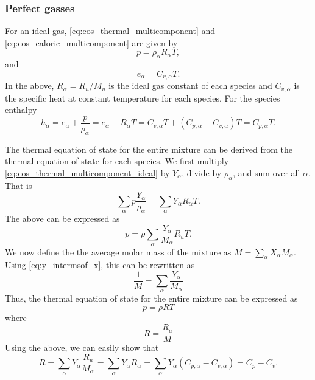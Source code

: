 \documentclass[oneside,a4paper,11pt]{report}
\begin{document}
\subsubsection{Perfect gasses}
For an ideal gas, \cref{eq:eos_thermal_multicomponent} and \cref{eq:eos_caloric_multicomponent} are given by
\begin{equation}
\label{eq:eos_thermal_multicomponent_ideal}
p = \rho_\alpha R_\alpha T,
\end{equation}
and
\begin{equation} 
\label{eq:eos_caloric_multicomponent_ideal}
e_\alpha = C_{v,\alpha} T .
\end{equation}
In the above, $R_\alpha = R_u / M_u$ is the ideal gas constant of each species and $C_{v,\alpha}$ is the specific heat at constant temperature for each species. For the species enthalpy 
\begin{equation}
    h_\alpha = e_\alpha + \frac{p}{\rho_\alpha} = e_\alpha + R_\alpha T = C_{v,\alpha} T + \left ( C_{p,\alpha} - C_{v,\alpha} \right ) T = C_{p,\alpha} T.
\end{equation}

The thermal equation of state for the entire mixture can be derived from the thermal equation of state for each species. We first multiply \cref{eq:eos_thermal_multicomponent_ideal} by $Y_\alpha$, divide by $\rho_\alpha$, and sum over all $\alpha$. That is
\begin{equation}
\sum_\alpha p \frac{Y_\alpha}{\rho_\alpha}= \sum_\alpha Y_\alpha R_\alpha T.
\end{equation}
The above can be expressed as
\begin{equation}
p = \rho \sum_\alpha \frac{Y_\alpha}{M_\alpha} R_u T.
\end{equation}
We now define the the average molar mass of the mixture as $M = \sum_\alpha X_\alpha M_\alpha$. Using \cref{eq:y_intermsof_x}, this can be rewritten as 
\begin{equation}
    \frac{1}{M} = \sum_\alpha \frac{Y_\alpha}{M_\alpha}
\end{equation}
Thus, the thermal equation of state for the entire mixture can be expressed as
\begin{equation}
    p = \rho R T
\end{equation}
where
\begin{equation}
R = \frac{R_u}{M}
\end{equation}
Using the above, we can easily show that
\begin{equation}
    R = \sum_\alpha Y_\alpha \frac{R_u}{M_\alpha} = \sum_\alpha Y_\alpha R_\alpha = \sum_\alpha Y_\alpha \left ( C_{p,\alpha} - C_{v,\alpha} \right ) = C_p - C_v.
\end{equation}
\end{document}

